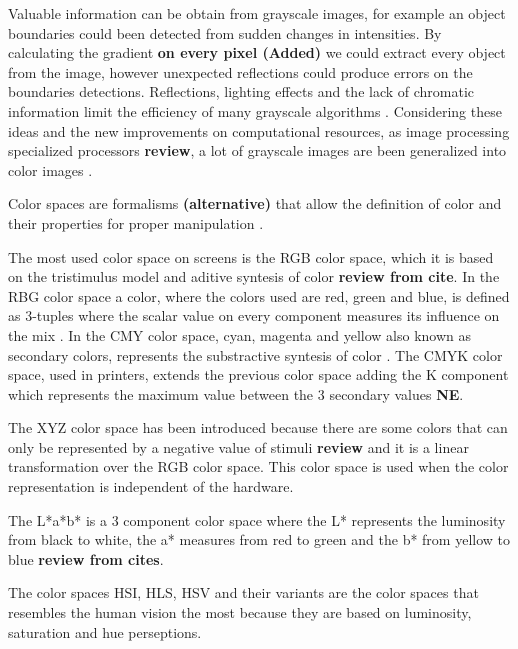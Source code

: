 Valuable information can be obtain from grayscale images, for example an object boundaries could been detected from sudden changes in intensities. By calculating the gradient \textbf{on every pixel (Added)} we could extract every object from the image, however unexpected reflections could produce errors on the boundaries detections. Reflections, lighting effects and the lack of chromatic information limit the efficiency of many grayscale algorithms \cite{ortiz2002procesamiento}. Considering these ideas and the new improvements on computational resources, as image processing specialized processors \textbf{review}, a lot of grayscale images are been generalized into color images \cite{ortiz2002procesamiento}.
  

Color spaces are formalisms \textbf{(alternative)} that allow the definition of color and their properties for proper manipulation \cite{joblove1978colo,meyer1980perceptual}.


The most used color space on screens is the RGB color space, which it is based on the tristimulus model and aditive syntesis of color \textbf{review from cite}. In the RBG color space a color, where the colors used are red, green and blue, is defined as 3-tuples where the scalar value on every component measures its influence on the mix \cite{tkalcic2003colour}. In the CMY color space, cyan, magenta and yellow also known as secondary colors, represents the substractive syntesis of color \cite{rolleston1996color}. The CMYK color space, used in printers\cite{rolleston1996color}, extends the previous color space adding the K component which represents the maximum value between the 3 secondary values\cite{tkalcic2003colour} \textbf{NE}.


The XYZ color space has been introduced because there are some colors that can only be represented by a negative value of stimuli \textbf{review} and it is a linear transformation over the RGB color space\cite{ortiz2002procesamiento}. This color space is used when the color representation is independent of the hardware.


The L*a*b* is a 3 component color space where the L* represents the luminosity from black to white, the a* measures from red to green and the b* from yellow to blue\cite{leon2006color} \textbf{review from cites}.


The color spaces HSI, HLS, HSV and their variants are the color spaces that resembles the human vision the most because they are based on luminosity, saturation and hue perseptions\cite{zamora2001comparativos}.


